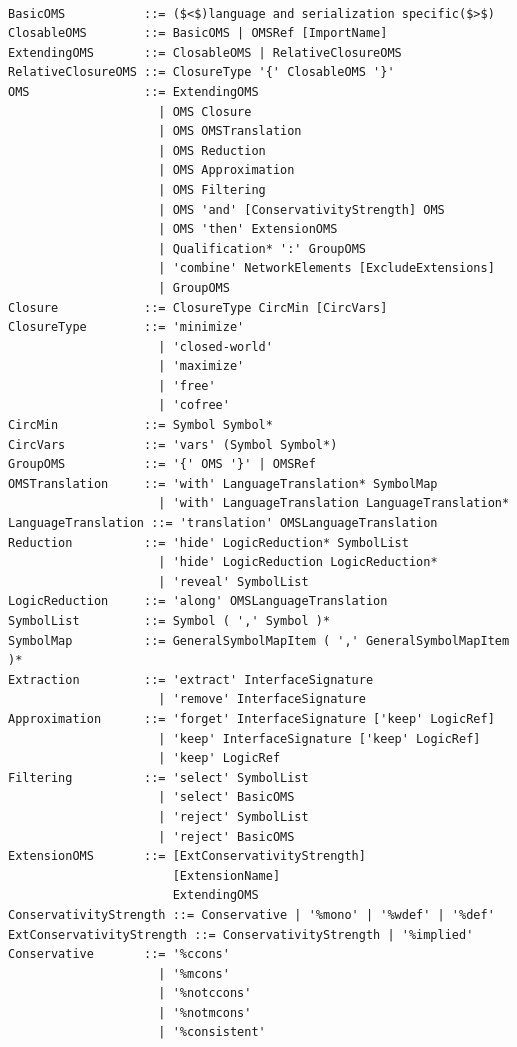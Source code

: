 \documentclass[10pt,fleqn,final]{scrreprt}
\newenvironment{definitions}[0]{\medskip }{}
\begin{document}
\begin{definitions}
\begin{lstlisting}[language=ebnf,escapeinside={()},mathescape]

BasicOMS           ::= ($<$)language and serialization specific($>$) 
ClosableOMS        ::= BasicOMS | OMSRef [ImportName]
ExtendingOMS       ::= ClosableOMS | RelativeClosureOMS
RelativeClosureOMS ::= ClosureType '{' ClosableOMS '}'
OMS                ::= ExtendingOMS
                     | OMS Closure
                     | OMS OMSTranslation
                     | OMS Reduction
                     | OMS Approximation
                     | OMS Filtering
                     | OMS 'and' [ConservativityStrength] OMS
                     | OMS 'then' ExtensionOMS
                     | Qualification* ':' GroupOMS
                     | 'combine' NetworkElements [ExcludeExtensions]
                     | GroupOMS
Closure            ::= ClosureType CircMin [CircVars]
ClosureType        ::= 'minimize'
                     | 'closed-world'
                     | 'maximize'
                     | 'free'
                     | 'cofree'
CircMin            ::= Symbol Symbol*
CircVars           ::= 'vars' (Symbol Symbol*)
GroupOMS           ::= '{' OMS '}' | OMSRef
OMSTranslation     ::= 'with' LanguageTranslation* SymbolMap
                     | 'with' LanguageTranslation LanguageTranslation*
LanguageTranslation ::= 'translation' OMSLanguageTranslation
Reduction          ::= 'hide' LogicReduction* SymbolList
                     | 'hide' LogicReduction LogicReduction*
                     | 'reveal' SymbolList
LogicReduction     ::= 'along' OMSLanguageTranslation
SymbolList         ::= Symbol ( ',' Symbol )*
SymbolMap          ::= GeneralSymbolMapItem ( ',' GeneralSymbolMapItem )*
Extraction         ::= 'extract' InterfaceSignature
                     | 'remove' InterfaceSignature
Approximation      ::= 'forget' InterfaceSignature ['keep' LogicRef]
                     | 'keep' InterfaceSignature ['keep' LogicRef]
                     | 'keep' LogicRef
Filtering          ::= 'select' SymbolList
                     | 'select' BasicOMS
                     | 'reject' SymbolList
                     | 'reject' BasicOMS
ExtensionOMS       ::= [ExtConservativityStrength]
                       [ExtensionName]
                       ExtendingOMS
ConservativityStrength ::= Conservative | '%mono' | '%wdef' | '%def'
ExtConservativityStrength ::= ConservativityStrength | '%implied'
Conservative       ::= '%ccons'
                     | '%mcons'
                     | '%notccons'
                     | '%notmcons'
                     | '%consistent'

\end{lstlisting}
\end{definitions}
\end{document}
